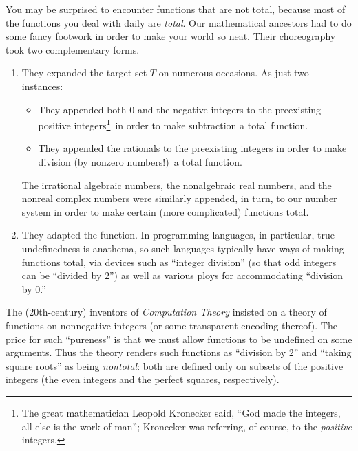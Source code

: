
You may be surprised to encounter functions that are not total,
because most of the functions you deal with daily are {\em total}.
Our mathematical ancestors had to do some fancy footwork in order to
make your world so neat.  Their choreography took two complementary
forms.
\begin{enumerate}
\item
They expanded the target set $T$ on numerous occasions.  As just two
instances:
  \begin{itemize}
  \item
They appended both $0$ and the negative integers to the preexisting
positive integers\footnote{The great mathematician Leopold Kronecker
  said, ``God made the integers, all else is the work of man'';
  Kronecker was referring, of course, to the {\em positive}
  integers.}~in order to make subtraction a total function.

  \item
They appended the rationals to the preexisting integers in order to
make division (by nonzero numbers!)~a total function.
  \end{itemize}
The irrational algebraic numbers, the nonalgebraic real numbers, and
the nonreal complex numbers were similarly appended, in turn, to our
number system in order to make certain (more complicated) functions
total.

\item
They adapted the function.  In programming languages, in particular,
true undefinedness is anathema, so such languages typically have ways
of making functions total, via devices such as ``integer division''
(so that odd integers can be ``divided by $2$'') as well as various
ploys for accommodating ``division by $0$.''
\end{enumerate}
The ($20$th-century) inventors of {\em Computation Theory} insisted on
a theory of functions on nonnegative integers (or some transparent
encoding thereof).  The price for such ``pureness'' is that we must
allow functions to be undefined on some arguments.  Thus the theory
renders such functions as ``division by $2$'' and ``taking square
roots'' as being {\em nontotal}: both are defined only on subsets of
the positive integers (the even integers and the perfect squares,
respectively).

